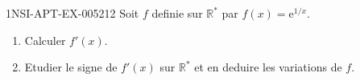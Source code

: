 \begin{exercice}{1NSI-APT-EX-005}{2}{12}
Soit $f$ definie sur $\mathbb{R}^*$ par $f(x) = \mathrm{e}^{1/x}$.
\begin{enumerate}
  \item Calculer $f'(x)$.
  \item Etudier le signe de $f'(x)$ sur $\mathbb{R}^*$ et en deduire les variations de $f$.
\end{enumerate}

\end{exercice}
